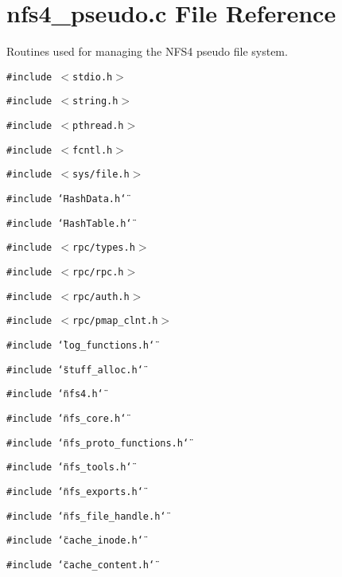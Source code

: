 \section{nfs4\_\-pseudo.c File Reference}
\label{nfs4__pseudo_8c}
Routines used for managing the NFS4 pseudo file system. 

{\tt \#include $<$stdio.h$>$}\par
{\tt \#include $<$string.h$>$}\par
{\tt \#include $<$pthread.h$>$}\par
{\tt \#include $<$fcntl.h$>$}\par
{\tt \#include $<$sys/file.h$>$}\par
{\tt \#include \char`\"{}Hash\-Data.h\char`\"{}}\par
{\tt \#include \char`\"{}Hash\-Table.h\char`\"{}}\par
{\tt \#include $<$rpc/types.h$>$}\par
{\tt \#include $<$rpc/rpc.h$>$}\par
{\tt \#include $<$rpc/auth.h$>$}\par
{\tt \#include $<$rpc/pmap\_\-clnt.h$>$}\par
{\tt \#include \char`\"{}log\_\-functions.h\char`\"{}}\par
{\tt \#include \char`\"{}stuff\_\-alloc.h\char`\"{}}\par
{\tt \#include \char`\"{}nfs4.h\char`\"{}}\par
{\tt \#include \char`\"{}nfs\_\-core.h\char`\"{}}\par
{\tt \#include \char`\"{}nfs\_\-proto\_\-functions.h\char`\"{}}\par
{\tt \#include \char`\"{}nfs\_\-tools.h\char`\"{}}\par
{\tt \#include \char`\"{}nfs\_\-exports.h\char`\"{}}\par
{\tt \#include \char`\"{}nfs\_\-file\_\-handle.h\char`\"{}}\par
{\tt \#include \char`\"{}cache\_\-inode.h\char`\"{}}\par
{\tt \#include \char`\"{}cache\_\-content.h\char`\"{}}\par

